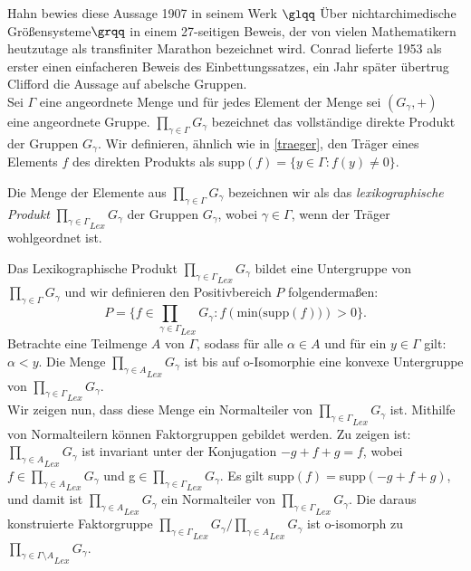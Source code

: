 Hahn bewies diese Aussage 1907 in seinem Werk $\glqq$ Über nichtarchimedische Größensysteme$\grqq$ in einem 27-seitigen Beweis, der von vielen Mathematikern heutzutage als transfiniter Marathon bezeichnet wird. Conrad lieferte 1953 als erster einen einfacheren Beweis des Einbettungssatzes, ein Jahr später übertrug Clifford die Aussage auf abelsche Gruppen. \\
%
Sei $\Gamma$ eine angeordnete Menge und für jedes Element der Menge sei $\left(G_\gamma, +\right)$ eine angeordnete Gruppe. $\prod_{\gamma \in \Gamma} G_\gamma$ bezeichnet das vollständige direkte Produkt der Gruppen $G_\gamma$. Wir definieren, ähnlich wie in \ref{traeger}, den Träger eines Elements $f$ des direkten Produkts als supp$\left(f\right) = \lbrace y \in \Gamma: f(y) \neq 0 \rbrace$. \cite{priesscrampe83}
\begin{defn} %
Die Menge der Elemente aus $\prod_{\gamma \in \Gamma} G_\gamma$ bezeichnen wir als das \textit{lexikographische Produkt} ${\prod_{\gamma \in \Gamma}}_{Lex} G_\gamma$ der Gruppen $G_\gamma$, wobei $\gamma \in \Gamma$, wenn der Träger wohlgeordnet ist.
\end{defn}
Das Lexikographische Produkt ${\prod_{\gamma \in \Gamma}}_{Lex} G_\gamma$ bildet eine Untergruppe von  $\prod_{\gamma \in \Gamma} G_\gamma$ und wir definieren den Positivbereich $P$ folgendermaßen:\\
\[ P = \lbrace f \in {\prod_{\gamma \in \Gamma}}_{Lex} G_\gamma: 
f\left(\text{min(supp}(f))\right) > 0 \rbrace.\]
Betrachte eine Teilmenge $A$ von $\Gamma$, sodass für alle $\alpha \in A$ und für ein $y\in\Gamma$ gilt: $\alpha < y$. Die Menge ${\prod_{\gamma \in A}}_{Lex} G_\gamma$ ist bis auf o-Isomorphie eine konvexe Untergruppe von ${\prod_{\gamma \in \Gamma}}_{Lex} G_\gamma$.\\
Wir zeigen nun, dass diese Menge ein Normalteiler von ${\prod_{\gamma \in \Gamma}}_{Lex} G_\gamma$ ist. Mithilfe von Normalteilern können Faktorgruppen gebildet werden. Zu zeigen ist:  ${\prod_{\gamma \in A}}_{Lex} G_\gamma$ ist invariant unter der Konjugation $-g+f+g = f$, wobei $f \in  {\prod_{\gamma \in A}}_{Lex} G_\gamma$ und g$\in  {\prod_{\gamma \in \Gamma}}_{Lex} G_\gamma$. Es gilt supp$\left(f\right) = $supp$\left(-g + f + g\right)$, und damit ist  ${\prod_{\gamma \in A}}_{Lex} G_\gamma$ ein Normalteiler von  ${\prod_{\gamma \in \Gamma}}_{Lex} G_\gamma$. Die daraus konstruierte Faktorgruppe  ${\prod_{\gamma \in \Gamma}}_{Lex} G_\gamma /  {\prod_{\gamma \in A}}_{Lex} G_\gamma$ ist o-isomorph zu  ${\prod_{\gamma \in \Gamma\setminus A}}_{Lex} G_\gamma$.
